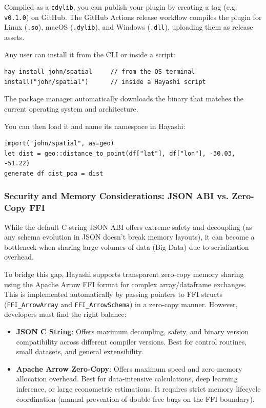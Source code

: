Compiled as a \texttt{cdylib}, you can publish your plugin by creating a tag (e.g. \texttt{v0.1.0}) on GitHub. The GitHub Actions release workflow compiles the plugin for Linux (\texttt{.so}), macOS (\texttt{.dylib}), and Windows (\texttt{.dll}), uploading them as release assets.

Any user can install it from the CLI or inside a script:
\begin{lstlisting}[style=inline, numbers=none, frame=none]
hay install john/spatial     // from the OS terminal
install("john/spatial")      // inside a Hayashi script
\end{lstlisting}
The package manager automatically downloads the binary that matches the current operating system and architecture.

You can then load it and name its namespace in Hayashi:
\begin{lstlisting}
import("john/spatial", as=geo)
let dist = geo::distance_to_point(df["lat"], df["lon"], -30.03, -51.22)
generate df dist_poa = dist
\end{lstlisting}

\subsubsection{Security and Memory Considerations: JSON ABI vs. Zero-Copy FFI}
While the default C-string JSON ABI offers extreme safety and decoupling (as any schema evolution in JSON doesn't break memory layouts), it can become a bottleneck when sharing large volumes of data (Big Data) due to serialization overhead. 

To bridge this gap, Hayashi supports transparent zero-copy memory sharing using the Apache Arrow FFI format for complex array/dataframe exchanges. This is implemented automatically by passing pointers to FFI structs (\texttt{FFI\_ArrowArray} and \texttt{FFI\_ArrowSchema}) in a zero-copy manner. However, developers must find the right balance:
\begin{itemize}
    \item \textbf{JSON C String}: Offers maximum decoupling, safety, and binary version compatibility across different compiler versions. Best for control routines, small datasets, and general extensibility.
    \item \textbf{Apache Arrow Zero-Copy}: Offers maximum speed and zero memory allocation overhead. Best for data-intensive calculations, deep learning inference, or large econometric estimations. It requires strict memory lifecycle coordination (manual prevention of double-free bugs on the FFI boundary).
\end{itemize}

